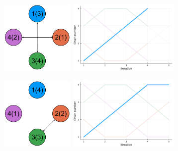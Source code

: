 \begin{figure}[t]
\begin{subfigure}{0.48\textwidth}
  \end{subfigure}
  \begin{subfigure}{0.48\textwidth}
    \centering
    \includegraphics[width=0.39\textwidth]{img/Communication_3_v3.pdf}
    \includegraphics[width=0.59\textwidth]{img/index_process_3.pdf}
  \end{subfigure}
  \begin{subfigure}{0.48\textwidth}
    \centering
    \includegraphics[width=0.39\textwidth]{img/Communication_4_v3.pdf}
    \includegraphics[width=0.59\textwidth]{img/index_process_4.pdf}

\end{subfigure}
\end{figure}
